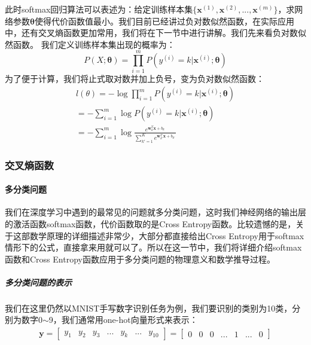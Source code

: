 \documentclass[UTF8]{article}
\begin{document}
此时softmax回归算法可以表述为：给定训练样本集$\{ \boldsymbol{x}^{(1)}, \boldsymbol{x}^{(2)}, ..., \boldsymbol{x}^{(m)} \}$，求网络参数$\boldsymbol{\theta}$使得代价函数值最小。我们目前已经讲过负对数似然函数，在实际应用中，还有交叉熵函数更加常用，我们将在下一节中进行讲解。我们先来看负对数似然函数。
我们定义训练样本集出现的概率为：
\begin{equation}
P(X;\boldsymbol{\theta}) = \prod_{i=1}^{m} P(y^{(i)}=k \vert \boldsymbol{x}^{(i)}; \boldsymbol{\theta})
\label{lcrn-softmax-regression-nll-1}
\end{equation}
为了便于计算，我们将止式取对数并加上负号，变为负对数似然函数：
\begin{equation}
\begin{aligned}
l(\theta) = -\log \prod_{i=1}^{m} P(y^{(i)}=k \vert \boldsymbol{x}^{(i)}; \boldsymbol{\theta}) \\
=-\sum_{i=1}^{m} \log P(y^{(i)}=k \vert \boldsymbol{x}^{(i)}; \boldsymbol{\theta}) \\
=-\sum_{i=1}^{m} \log \frac{e^{\boldsymbol{w}_{k}^{T}\boldsymbol{x} + b_{k}}}{\sum_{k'=1}^{K} e^{\boldsymbol{w}_{k'}^{T}\boldsymbol{x} + b_{k'}} }
\end{aligned}
\label{lcrn-softmax-regression-nll-2}
\end{equation}
\subsubsection{交叉熵函数}
\paragraph{多分类问题}
我们在深度学习中遇到的最常见的问题就多分类问题，这时我们神经网络的输出层的激活函数softmax函数，代价函数取的是Cross Entropy函数。比较遗憾的是，关于这部数学原理的详细描述非常少，大部分都直接给出Cross Entropy用于softmax情形下的公式，直接拿来用就可以了。所以在这一节中，我们将详细介绍softmax函数和Cross Entropy函数应用于多分类问题的物理意义和数学推导过程。
\subparagraph{多分类问题的表示}
我们在这里仍然以MNIST手写数字识别任务为例，我们要识别的类别为10类，分别为数字0$\sim$9，我们通常用one-hot向量形式来表示：
\begin{equation}
\begin{aligned}
\boldsymbol{y}=\begin{bmatrix}
y_1 & y_2 & y_3 & ... & y_k & ...& y_{10}
\end{bmatrix}=\begin{bmatrix}
0 & 0 & 0 & ... & 1 & ...& 0
\end{bmatrix}
\end{aligned}
\label{lcrg-multi-classification-one-hot}
\end{equation}
\end{document}
